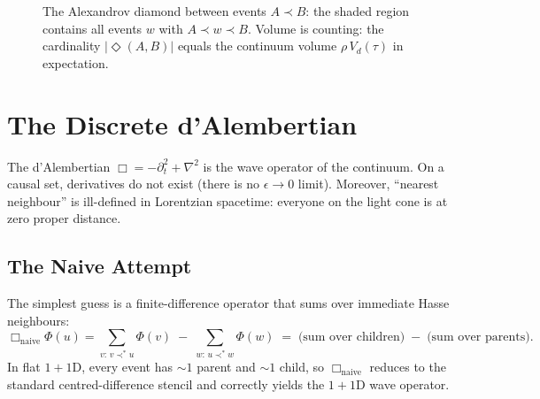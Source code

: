 \documentclass[11pt, a4paper, openany]{book}
\newcommand{\covers}{\prec^*}              %
\newcommand{\diam}[2]{|\Diamond(#1,#2)|}   %
\begin{document}
\begin{figure}[ht]
\centering
{}
\caption{The Alexandrov diamond between events $A \prec B$: the shaded
region contains all events $w$ with $A \prec w \prec B$.  Volume is
counting: the cardinality $\diam{A}{B}$ equals the continuum volume
$\rho\,V_d(\tau)$ in expectation.}
\label{fig:alexandrov-diamond}
\end{figure}

\section{The Discrete d'Alembertian}\label{sec:dalembertian}

The d'Alembertian $\Box = -\partial_t^2 + \nabla^2$ is the wave operator of
the continuum. On a causal set, derivatives do not exist (there is no
$\epsilon \to 0$ limit). Moreover, ``nearest neighbour'' is ill-defined
in Lorentzian spacetime: everyone on the light cone is at zero proper
distance.

\subsection{The Naive Attempt}

The simplest guess is a finite-difference operator that sums over
immediate Hasse neighbours:
\begin{equation}\label{eq:naive-box}
  \Box_{\mathrm{naive}}\Phi(u) = \sum_{v:\,v\covers u}\!\Phi(v)
  \;-\; \sum_{w:\,u\covers w}\!\Phi(w)
  \;=\; \bigl(\text{sum over children}\bigr)
  \;-\; \bigl(\text{sum over parents}\bigr).
\end{equation}
In flat $1{+}1$D, every event has $\sim 1$ parent and $\sim 1$ child,
so $\Box_{\mathrm{naive}}$ reduces to the standard centred-difference
stencil and correctly yields the $1{+}1$D wave operator.
\end{document}
